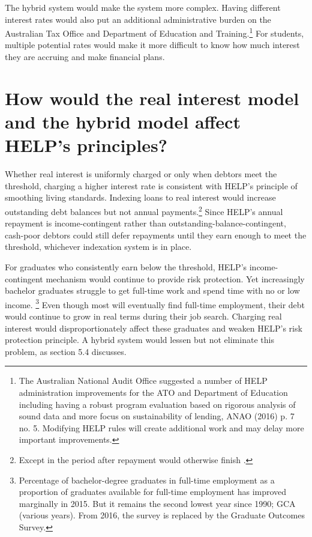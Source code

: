 \documentclass[embargoed]{grattan}
\begin{document}
The hybrid system would make the system more complex. Having different interest rates would also put an additional administrative burden on the Australian Tax Office and Department of Education and Training.\footnote{The Australian National Audit Office suggested a number of HELP administration improvements for the ATO and Department of Education including having a robust program evaluation based on rigorous analysis of sound data and more focus on sustainability of lending, ANAO (2016) p. 7 no. 5. Modifying HELP rules will create additional work and may delay more important improvements.} For students, multiple potential rates would make it more difficult to know how much interest they are accruing and make financial plans.

\section{How would the real interest model and the hybrid model affect HELP's principles?}\label{how-would-the-real-interest-model-and-the-hybrid-model-affect-helps-principles}

Whether real interest is uniformly charged or only when debtors meet the threshold, charging a higher interest rate is consistent with HELP's principle of smoothing living standards. Indexing loans to real interest would increase outstanding debt balances but not annual payments.\footnote{Except in the period after repayment would otherwise finish .} Since HELP's annual repayment is income-contingent rather than outstanding-balance-contingent, cash-poor debtors could still defer repayments until they earn enough to meet the threshold, whichever indexation system is in place.

For graduates who consistently earn below the threshold, HELP's income-contingent mechanism would continue to provide risk protection. Yet increasingly bachelor graduates struggle to get full-time work and spend time with no or low income. \footnote{Percentage of bachelor-degree graduates in full-time employment as a proportion of graduates available for full-time employment has improved marginally in 2015. But it remains the second lowest year since 1990; GCA (various years). From 2016, the survey is replaced by the Graduate Outcomes Survey.} Even though most will eventually find full-time employment, their debt would continue to grow in real terms during their job search. Charging real interest would disproportionately affect these graduates and weaken HELP's risk protection principle. A hybrid system would lessen but not eliminate this problem, as section 5.4 discusses.
\end{document}
